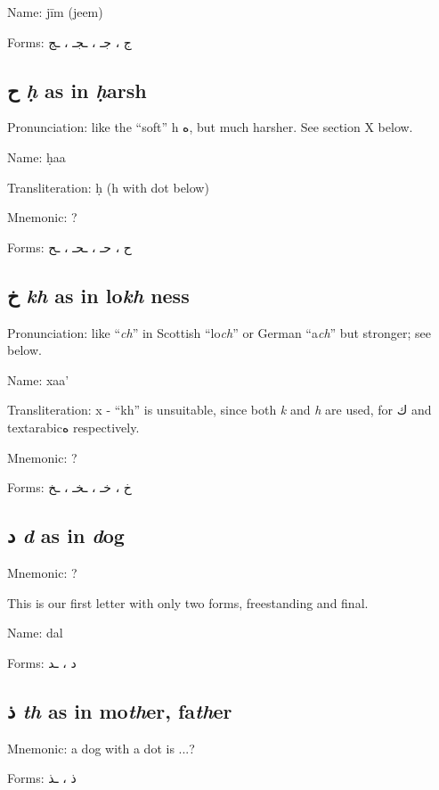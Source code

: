 \documentclass[11pt]{article}
\begin{document}
\noindent Name: jīm (jeem)

\noindent Forms: \textarabic{ج ، جـ ، ـجـ ، ـج}

\subsection{ \textarabic{ح} \textit{ḥ} as in \textit{ḥ}arsh}
Pronunciation: like the ``soft'' h \textarabic{ه}, but much harsher.
See section X below.

\noindent Name: ḥaa

\noindent Transliteration: ḥ (h with dot below)

\noindent Mnemonic:  ?

\noindent Forms: \textarabic{ح ، حـ ، ـحـ ، ـح}

\subsection{ \textarabic{خ} \textit{kh} as in lo\textit{kh} ness}
Pronunciation: like ``\textit{ch}'' in Scottish ``lo\textit{ch}'' or
German ``a\textit{ch}'' but stronger; see below.

\noindent Name: xaa'

\noindent Transliteration: x - ``kh'' is unsuitable, since both
\textit{k} and \textit{h} are used, for \textarabic{ك} and
textarabic{ه} respectively.

\noindent Mnemonic:  ?

\noindent Forms: \textarabic{خ ، خـ ، ـخـ ، ـخ}

\subsection{ \textarabic{د} \textit{d} as in \textit{d}og}
Mnemonic:  ?

This is our first letter with only two forms, freestanding and final.

\noindent Name: dal

\noindent Forms: \textarabic{د ، ـد}

\subsection{ \textarabic{ذ} \textit{th} as in mo\textit{th}er, fa\textit{th}er}
Mnemonic:  a dog with a dot is ...?

\noindent Forms: \textarabic{ذ ، ـذ}

\end{document}
